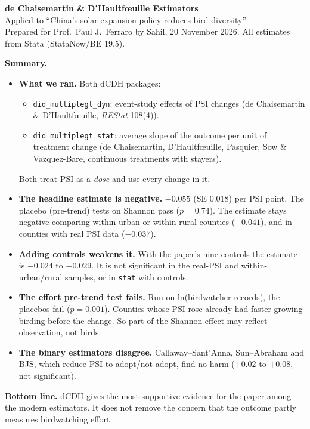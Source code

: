 \documentclass[11pt]{article}
\begin{document}
\begin{center}
{\LARGE\bfseries de Chaisemartin \& D'Haultf\oe uille Estimators}\\[4pt]
{\large Applied to ``China's solar expansion policy reduces bird diversity''}\\[5pt]
{\small Prepared for Prof.\ Paul J.\ Ferraro by Sahil, 20 November 2026. All estimates from Stata (StataNow/BE 19.5).}
\end{center}

\begin{answerbox}
\textbf{Summary.}
\begin{itemize}[leftmargin=14pt,itemsep=2pt,topsep=2pt]
\item \textbf{What we ran.} Both dCDH packages:
\begin{itemize}[leftmargin=12pt,itemsep=1pt]
\item \texttt{did\_multiplegt\_dyn}: event-study effects of PSI changes (de Chaisemartin \& D'Haultf\oe uille, \textit{REStat} 108(4)).
\item \texttt{did\_multiplegt\_stat}: average slope of the outcome per unit of treatment change (de Chaisemartin, D'Haultf\oe uille, Pasquier, Sow \& Vazquez-Bare, continuous treatments with stayers).
\end{itemize}
Both treat PSI as a \emph{dose} and use every change in it.
\item \textbf{The headline estimate is negative.} $-0.055$ (SE 0.018) per PSI point. The placebo (pre-trend) tests on Shannon pass ($p=0.74$). The estimate stays negative comparing within urban or within rural counties ($-0.041$), and in counties with real PSI data ($-0.037$).
\item \textbf{Adding controls weakens it.} With the paper's nine controls the estimate is $-0.024$ to $-0.029$. It is not significant in the real-PSI and within-urban/rural samples, or in \texttt{stat} with controls.
\item \textbf{The effort pre-trend test fails.} Run on ln(birdwatcher records), the placebos fail ($p=0.001$). Counties whose PSI rose already had faster-growing birding before the change. So part of the Shannon effect may reflect observation, not birds.
\item \textbf{The binary estimators disagree.} Callaway--Sant'Anna, Sun--Abraham and BJS, which reduce PSI to adopt/not adopt, find no harm ($+0.02$ to $+0.08$, not significant).
\end{itemize}
\textbf{Bottom line.} dCDH gives the most supportive evidence for the paper among the modern estimators. It does not remove the concern that the outcome partly measures birdwatching effort.
\end{answerbox}
\end{document}
